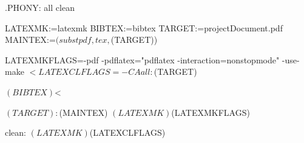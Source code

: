 .PHONY: all clean

LATEXMK:=latexmk
BIBTEX:=bibtex
TARGET:=projectDocument.pdf
MAINTEX:=$(subst pdf,tex,$(TARGET))

LATEXMKFLAGS=-pdf -pdflatex="pdflatex -interaction=nonstopmode" -use-make $<
LATEXCLFLAGS=-CA

all: $(TARGET)

	$(BIBTEX) $<

$(TARGET) : $(MAINTEX)
	$(LATEXMK) $(LATEXMKFLAGS)

clean:
	$(LATEXMK) $(LATEXCLFLAGS)
